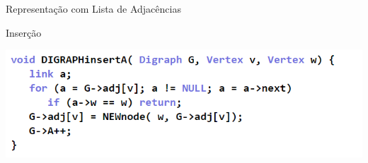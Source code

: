 \documentclass[xcolor=dvipsnames,table]{beamer}
\begin{document}
	\begin{frame}{Representação com Lista de Adjacências}
		\begin{block}{Inserção}
			\begin{center}
	    		\includegraphics[height=.4\textheight]{images/lista/digraph-insert-a.png}
	  		\end{center}
		\end{block}
	\end{frame}
	
	\begin{frame}
		\titlepage
	\end{frame}
	
\end{document}
